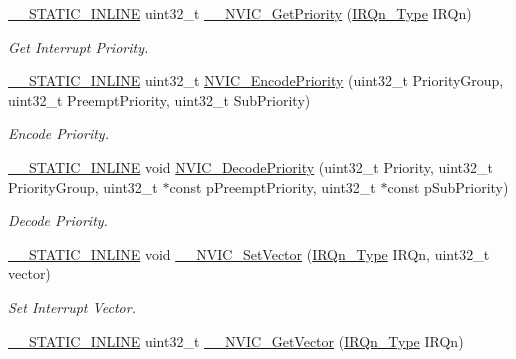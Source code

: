 \begin{DoxyCompactItemize}
\hyperlink{cmsis__iccarm_8h_aba87361bfad2ae52cfe2f40c1a1dbf9c}{\+\_\+\+\_\+\+S\+T\+A\+T\+I\+C\+\_\+\+I\+N\+L\+I\+NE} uint32\+\_\+t \hyperlink{group___c_m_s_i_s___core___n_v_i_c_functions_gaeb9dc99c8e7700668813144261b0bc73}{\+\_\+\+\_\+\+N\+V\+I\+C\+\_\+\+Get\+Priority} (\hyperlink{group___peripheral__interrupt__number__definition_ga7e1129cd8a196f4284d41db3e82ad5c8}{I\+R\+Qn\+\_\+\+Type} I\+R\+Qn)
\begin{DoxyCompactList}\small\item\em Get Interrupt Priority. \end{DoxyCompactList}\item 
\hyperlink{cmsis__iccarm_8h_aba87361bfad2ae52cfe2f40c1a1dbf9c}{\+\_\+\+\_\+\+S\+T\+A\+T\+I\+C\+\_\+\+I\+N\+L\+I\+NE} uint32\+\_\+t \hyperlink{group___c_m_s_i_s___core___n_v_i_c_functions_gadb94ac5d892b376e4f3555ae0418ebac}{N\+V\+I\+C\+\_\+\+Encode\+Priority} (uint32\+\_\+t Priority\+Group, uint32\+\_\+t Preempt\+Priority, uint32\+\_\+t Sub\+Priority)
\begin{DoxyCompactList}\small\item\em Encode Priority. \end{DoxyCompactList}\item 
\hyperlink{cmsis__iccarm_8h_aba87361bfad2ae52cfe2f40c1a1dbf9c}{\+\_\+\+\_\+\+S\+T\+A\+T\+I\+C\+\_\+\+I\+N\+L\+I\+NE} void \hyperlink{group___c_m_s_i_s___core___n_v_i_c_functions_ga3387607fd8a1a32cccd77d2ac672dd96}{N\+V\+I\+C\+\_\+\+Decode\+Priority} (uint32\+\_\+t Priority, uint32\+\_\+t Priority\+Group, uint32\+\_\+t $\ast$const p\+Preempt\+Priority, uint32\+\_\+t $\ast$const p\+Sub\+Priority)
\begin{DoxyCompactList}\small\item\em Decode Priority. \end{DoxyCompactList}\item 
\hyperlink{cmsis__iccarm_8h_aba87361bfad2ae52cfe2f40c1a1dbf9c}{\+\_\+\+\_\+\+S\+T\+A\+T\+I\+C\+\_\+\+I\+N\+L\+I\+NE} void \hyperlink{group___c_m_s_i_s___core___n_v_i_c_functions_ga0df355460bc1783d58f9d72ee4884208}{\+\_\+\+\_\+\+N\+V\+I\+C\+\_\+\+Set\+Vector} (\hyperlink{group___peripheral__interrupt__number__definition_ga7e1129cd8a196f4284d41db3e82ad5c8}{I\+R\+Qn\+\_\+\+Type} I\+R\+Qn, uint32\+\_\+t vector)
\begin{DoxyCompactList}\small\item\em Set Interrupt Vector. \end{DoxyCompactList}\item 
\hyperlink{cmsis__iccarm_8h_aba87361bfad2ae52cfe2f40c1a1dbf9c}{\+\_\+\+\_\+\+S\+T\+A\+T\+I\+C\+\_\+\+I\+N\+L\+I\+NE} uint32\+\_\+t \hyperlink{group___c_m_s_i_s___core___n_v_i_c_functions_ga44b665d2afb708121d9b10c76ff00ee5}{\+\_\+\+\_\+\+N\+V\+I\+C\+\_\+\+Get\+Vector} (\hyperlink{group___peripheral__interrupt__number__definition_ga7e1129cd8a196f4284d41db3e82ad5c8}{I\+R\+Qn\+\_\+\+Type} I\+R\+Qn)

\end{DoxyCompactItemize}
